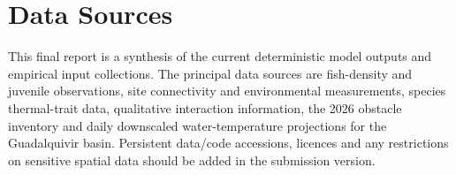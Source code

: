 \documentclass[11pt,a4paper]{article}
\begin{document}
\section{Data Sources}

This final report is a synthesis of the current deterministic model outputs and empirical input collections. The principal data sources are fish-density and juvenile observations, site connectivity and environmental measurements, species thermal-trait data, qualitative interaction information, the 2026 obstacle inventory and daily downscaled water-temperature projections for the Guadalquivir basin. Persistent data/code accessions, licences and any restrictions on sensitive spatial data should be added in the submission version.



\end{document}
